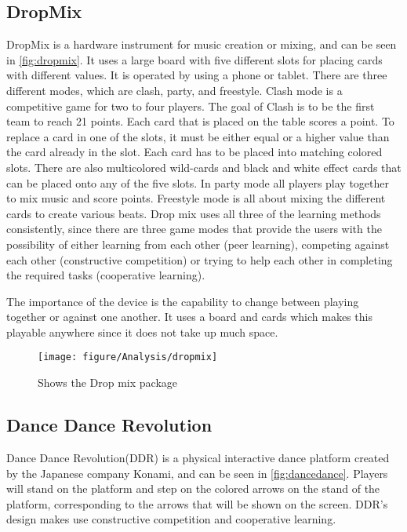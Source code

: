 \subsection{DropMix}
DropMix is a hardware instrument for music creation or mixing, and can be seen in \autoref{fig:dropmix}. It uses a large board with five different slots for placing cards with different values. It is operated by using a phone or tablet. There are three different modes, which are clash, party, and freestyle. Clash mode is a competitive game for two to four players. The goal of Clash is to be the first team to reach 21 points. Each card that is placed on the table scores a point. To replace a card in one of the slots, it must be either equal or a higher value than the card already in the slot. Each card has to be placed into matching colored slots. There are also multicolored wild-cards and black and white effect cards that can be placed onto any of the five slots. In party mode all players play together to mix music and score points. Freestyle mode is all about mixing the different cards to create various beats. Drop mix uses all three of the learning methods consistently, since there are three game modes that provide the users with the possibility of either learning from each other (peer learning), competing against each other (constructive competition) or trying to help each other in completing the required tasks (cooperative learning).

The importance of the device is the capability to change between playing together or against one another. It uses a board and cards which makes this playable anywhere since it does not take up much space.


\begin{figure}[H]
	\centering
	\texttt{[image: figure/Analysis/dropmix]}
	\caption{Shows the Drop mix package}
	\label{fig:dropmix}
\end{figure}


\subsection{Dance Dance Revolution}
Dance Dance Revolution(DDR) is a physical interactive dance platform created by the Japanese company Konami, and can be seen in \autoref{fig:dancedance}. Players will stand on the platform and step on the colored arrows on the stand of the platform, corresponding to the arrows that will be shown on the screen. DDR's design makes use constructive competition and cooperative learning.


